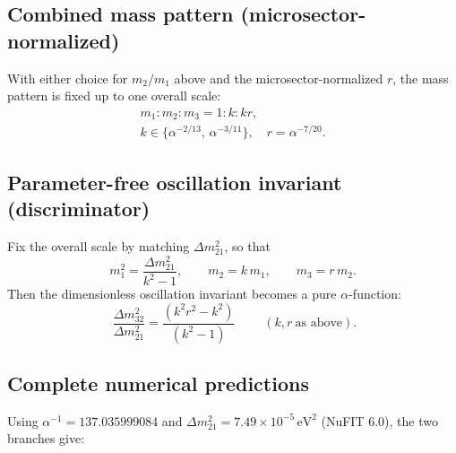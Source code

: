 \subsection{Combined mass pattern (microsector-normalized)}\label{app:nu-pattern}

With either choice for $m_2/m_1$ above and the microsector-normalized $r$, the mass
pattern is fixed up to one overall scale:
\begin{equation}
\begin{gathered}
m_1 : m_2 : m_3 = 1 : k : kr, \\
k \in \{\alpha^{-2/13},\,\alpha^{-3/11}\}, \quad r = \alpha^{-7/20}.
\end{gathered}
\end{equation}


\subsection{Parameter-free oscillation invariant (discriminator)}\label{app:nu-invariant}

Fix the overall scale by matching $\Delta m^2_{21}$, so that
\begin{equation}
m_1^2 = \frac{\Delta m^2_{21}}{k^2-1},\qquad
m_2 = k\,m_1,\qquad
m_3 = r\,m_2.
\end{equation}
Then the dimensionless oscillation invariant becomes a pure $\alpha$-function:
\begin{equation}
\boxed{\;\frac{\Delta m^2_{32}}{\Delta m^2_{21}}
= \frac{(k^2 r^2 - k^2)}{(k^2-1)}\;}
\qquad
(k,r \ \text{as above}).
\end{equation}


\subsection{Complete numerical predictions}\label{app:nu-numbers}

Using $\alpha^{-1}=137.035999084$ and $\Delta m^2_{21}=7.49\times10^{-5}\,\mathrm{eV}^2$
(NuFIT 6.0), the two branches give:

